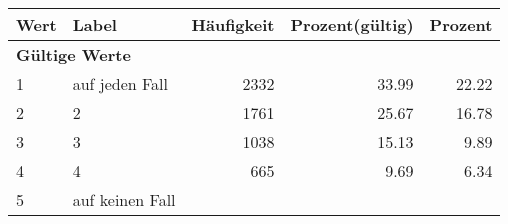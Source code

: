      \begin{longtable}{lXrrr}
     \toprule
     \textbf{Wert} & \textbf{Label} & \textbf{Häufigkeit} & \textbf{Prozent(gültig)} & \textbf{Prozent} \\
     \endhead
     \midrule
     \multicolumn{5}{l}{\textbf{Gültige Werte}}\\

     1 &
     \multicolumn{1}{X}{ auf jeden Fall   } &


       \num{2332} &
       \num[round-mode=places,round-precision=2]{33,99} &
         \num[round-mode=places,round-precision=2]{22,22} \\

     2 &
     \multicolumn{1}{X}{ 2   } &


       \num{1761} &
       \num[round-mode=places,round-precision=2]{25,67} &
         \num[round-mode=places,round-precision=2]{16,78} \\

     3 &
     \multicolumn{1}{X}{ 3   } &


       \num{1038} &
       \num[round-mode=places,round-precision=2]{15,13} &
         \num[round-mode=places,round-precision=2]{9,89} \\

     4 &
     \multicolumn{1}{X}{ 4   } &


       \num{665} &
       \num[round-mode=places,round-precision=2]{9,69} &
         \num[round-mode=places,round-precision=2]{6,34} \\

     5 &
     \multicolumn{1}{X}{ auf keinen Fall   } &



\end{longtable}
